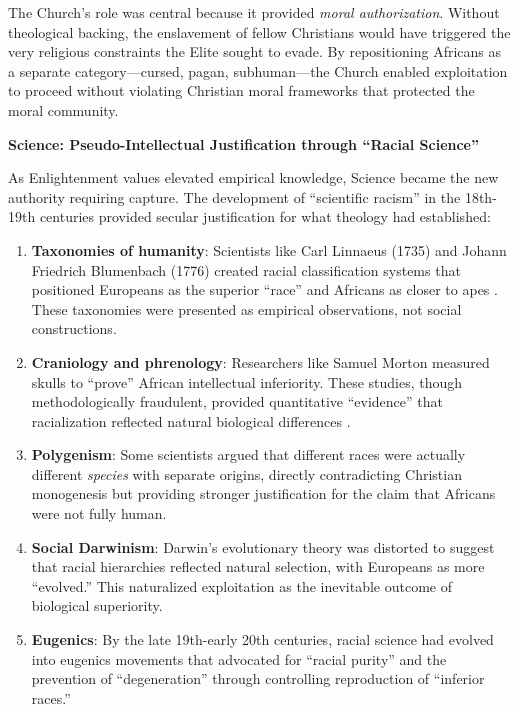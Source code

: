 The Church's role was central because it provided \textit{moral authorization}. Without theological backing, the enslavement of fellow Christians would have triggered the very religious constraints the Elite sought to evade. By repositioning Africans as a separate category---cursed, pagan, subhuman---the Church enabled exploitation to proceed without violating Christian moral frameworks that protected the moral community.

\textbf{Science: Pseudo-Intellectual Justification through ``Racial Science''}

As Enlightenment values elevated empirical knowledge, Science became the new authority requiring capture. The development of ``scientific racism'' in the 18th-19th centuries provided secular justification for what theology had established:

\begin{enumerate}
    \item \textbf{Taxonomies of humanity}: Scientists like Carl Linnaeus (1735) and Johann Friedrich Blumenbach (1776) created racial classification systems that positioned Europeans as the superior ``race'' and Africans as closer to apes \cite{gould}. These taxonomies were presented as empirical observations, not social constructions.
    
    \item \textbf{Craniology and phrenology}: Researchers like Samuel Morton measured skulls to ``prove'' African intellectual inferiority. These studies, though methodologically fraudulent, provided quantitative ``evidence'' that racialization reflected natural biological differences \cite{gould}.
    
    \item \textbf{Polygenism}: Some scientists argued that different races were actually different \textit{species} with separate origins, directly contradicting Christian mono\-genesis but providing stronger justification for the claim that Africans were not fully human.
    
    \item \textbf{Social Darwinism}: Darwin's evolutionary theory was distorted to suggest that racial hierarchies reflected natural selection, with Europeans as more ``evolved.'' This naturalized exploitation as the inevitable outcome of biological superiority.
    
    \item \textbf{Eugenics}: By the late 19th-early 20th centuries, racial science had evolved into eugenics movements that advocated for ``racial purity'' and the prevention of ``degeneration'' through controlling reproduction of ``inferior races.''
\end{enumerate}

